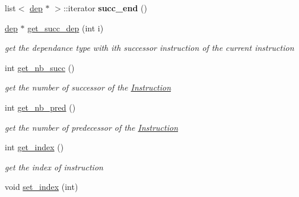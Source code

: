 \begin{DoxyCompactItemize}
\item 
\hypertarget{class_instruction_a0800ca0afbbc783b57170d981d406fb6}{list$<$ \hyperlink{structdep}{dep} $\ast$ $>$\-::iterator {\bfseries succ\-\_\-end} ()}\label{class_instruction_a0800ca0afbbc783b57170d981d406fb6}

\item 
\hypertarget{class_instruction_ad3bb47ea5f9e4b975e0191d6c96ffc30}{\hyperlink{structdep}{dep} $\ast$ \hyperlink{class_instruction_ad3bb47ea5f9e4b975e0191d6c96ffc30}{get\-\_\-succ\-\_\-dep} (int i)}\label{class_instruction_ad3bb47ea5f9e4b975e0191d6c96ffc30}

\begin{DoxyCompactList}\small\item\em get the dependance type with ith successor instruction of the current instruction \end{DoxyCompactList}\item 
\hypertarget{class_instruction_ab2d8c29efa78ec3c1a70f154a8c2f068}{int \hyperlink{class_instruction_ab2d8c29efa78ec3c1a70f154a8c2f068}{get\-\_\-nb\-\_\-succ} ()}\label{class_instruction_ab2d8c29efa78ec3c1a70f154a8c2f068}

\begin{DoxyCompactList}\small\item\em get the number of successor of the \hyperlink{class_instruction}{Instruction} \end{DoxyCompactList}\item 
\hypertarget{class_instruction_a9e56e8e2c857abc409f27af9f80f9595}{int \hyperlink{class_instruction_a9e56e8e2c857abc409f27af9f80f9595}{get\-\_\-nb\-\_\-pred} ()}\label{class_instruction_a9e56e8e2c857abc409f27af9f80f9595}

\begin{DoxyCompactList}\small\item\em get the number of predecessor of the \hyperlink{class_instruction}{Instruction} \end{DoxyCompactList}\item 
\hypertarget{class_instruction_a14c5f91c242a5b58eda9f123ad331cbe}{int \hyperlink{class_instruction_a14c5f91c242a5b58eda9f123ad331cbe}{get\-\_\-index} ()}\label{class_instruction_a14c5f91c242a5b58eda9f123ad331cbe}

\begin{DoxyCompactList}\small\item\em get the index of instruction \end{DoxyCompactList}\item 
\hypertarget{class_instruction_af1608cfea660c46e8a8b4bbac948406a}{void \hyperlink{class_instruction_af1608cfea660c46e8a8b4bbac948406a}{set\-\_\-index} (int)}\label{class_instruction_af1608cfea660c46e8a8b4bbac948406a}


\end{DoxyCompactItemize}
